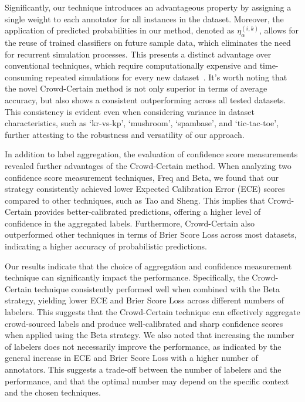 Significantly, our technique introduces an advantageous property by assigning a single weight to each annotator for all instances in the dataset. Moreover, the application of predicted probabilities in our method, denoted as $\eta_{\alpha}^{(i,k)}$, allows for the reuse of trained classifiers on future sample data, which eliminates the need for recurrent simulation processes. This presents a distinct advantage over conventional techniques, which require computationally expensive and time-consuming repeated simulations for every new dataset~\cite{tao_Label_2020}. It's worth noting that the novel Crowd-Certain method is not only superior in terms of average accuracy, but also shows a consistent outperforming across all tested datasets. This consistency is evident even when considering variance in dataset characteristics, such as `kr-vs-kp', `mushroom', `spambase', and `tic-tac-toe', further attesting to the robustness and versatility of our approach.

In addition to label aggregation, the evaluation of confidence score measurements revealed further advantages of the Crowd-Certain method. When analyzing two confidence score measurement techniques, Freq and Beta, we found that our strategy consistently achieved lower Expected Calibration Error (ECE) scores compared to other techniques, such as Tao and Sheng. This implies that Crowd-Certain provides better-calibrated predictions, offering a higher level of confidence in the aggregated labels. Furthermore, Crowd-Certain also outperformed other techniques in terms of Brier Score Loss across most datasets, indicating a higher accuracy of probabilistic predictions.

Our results indicate that the choice of aggregation and confidence measurement technique can significantly impact the performance. Specifically, the Crowd-Certain technique consistently performed well when combined with the Beta strategy, yielding lower ECE and Brier Score Loss across different numbers of labelers. This suggests that the Crowd-Certain technique can effectively aggregate crowd-sourced labels and produce well-calibrated and sharp confidence scores when applied using the Beta strategy. We also noted that increasing the number of labelers does not necessarily improve the performance, as indicated by the general increase in ECE and Brier Score Loss with a higher number of annotators. This suggests a trade-off between the number of labelers and the performance, and that the optimal number may depend on the specific context and the chosen techniques.

